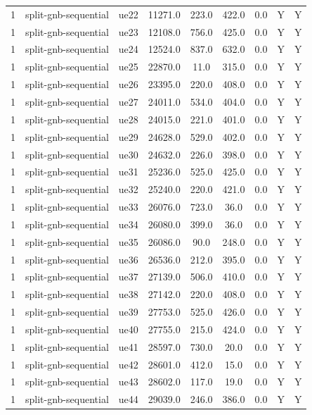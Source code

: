 \begin{table}[ht]
\begin{tabular}{|c|c|c|c|c|c|c|c|c|}
1 & split-gnb-sequential & ue22 & 11271.0 & 223.0 & 422.0 & 0.0 & Y & Y \\
1 & split-gnb-sequential & ue23 & 12108.0 & 756.0 & 425.0 & 0.0 & Y & Y \\
1 & split-gnb-sequential & ue24 & 12524.0 & 837.0 & 632.0 & 0.0 & Y & Y \\
1 & split-gnb-sequential & ue25 & 22870.0 & 11.0 & 315.0 & 0.0 & Y & Y \\
1 & split-gnb-sequential & ue26 & 23395.0 & 220.0 & 408.0 & 0.0 & Y & Y \\
1 & split-gnb-sequential & ue27 & 24011.0 & 534.0 & 404.0 & 0.0 & Y & Y \\
1 & split-gnb-sequential & ue28 & 24015.0 & 221.0 & 401.0 & 0.0 & Y & Y \\
1 & split-gnb-sequential & ue29 & 24628.0 & 529.0 & 402.0 & 0.0 & Y & Y \\
1 & split-gnb-sequential & ue30 & 24632.0 & 226.0 & 398.0 & 0.0 & Y & Y \\
1 & split-gnb-sequential & ue31 & 25236.0 & 525.0 & 425.0 & 0.0 & Y & Y \\
1 & split-gnb-sequential & ue32 & 25240.0 & 220.0 & 421.0 & 0.0 & Y & Y \\
1 & split-gnb-sequential & ue33 & 26076.0 & 723.0 & 36.0 & 0.0 & Y & Y \\
1 & split-gnb-sequential & ue34 & 26080.0 & 399.0 & 36.0 & 0.0 & Y & Y \\
1 & split-gnb-sequential & ue35 & 26086.0 & 90.0 & 248.0 & 0.0 & Y & Y \\
1 & split-gnb-sequential & ue36 & 26536.0 & 212.0 & 395.0 & 0.0 & Y & Y \\
1 & split-gnb-sequential & ue37 & 27139.0 & 506.0 & 410.0 & 0.0 & Y & Y \\
1 & split-gnb-sequential & ue38 & 27142.0 & 220.0 & 408.0 & 0.0 & Y & Y \\
1 & split-gnb-sequential & ue39 & 27753.0 & 525.0 & 426.0 & 0.0 & Y & Y \\
1 & split-gnb-sequential & ue40 & 27755.0 & 215.0 & 424.0 & 0.0 & Y & Y \\
1 & split-gnb-sequential & ue41 & 28597.0 & 730.0 & 20.0 & 0.0 & Y & Y \\
1 & split-gnb-sequential & ue42 & 28601.0 & 412.0 & 15.0 & 0.0 & Y & Y \\
1 & split-gnb-sequential & ue43 & 28602.0 & 117.0 & 19.0 & 0.0 & Y & Y \\
1 & split-gnb-sequential & ue44 & 29039.0 & 246.0 & 386.0 & 0.0 & Y & Y \\

\end{tabular}
\end{table}
